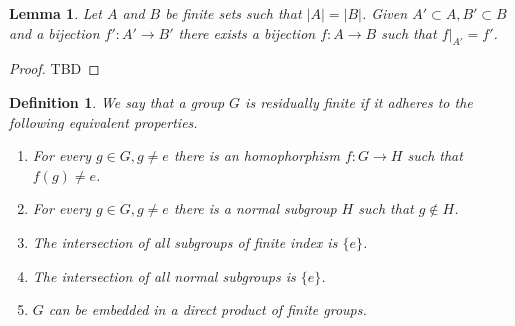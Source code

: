 \documentclass[a4paper]{memoir}
\newtheorem{definition}{Definition}
\newtheorem{lemma}{Lemma}
\begin{document}
    \begin{lemma}\label{lem:finite_bijections} 
        Let $A$ and $B$ be finite sets such that $|A| = |B|$. Given $A' \subset A, B' \subset B$ and a bijection $f': A' \to B'$ there exists a bijection $f:A \to B$ such that $f|_{A'} = f'$. 
    \end{lemma}
    \begin{proof}
        TBD
    \end{proof}

    \begin{definition}\cite{noauthor_residually_2018}
        We say that a group $G$ is residually finite if it adheres to the following equivalent properties.
        \begin{enumerate}
            \item For every $g \in G, g\ne e$ there is an homophorphism $f:G \to H$ such that $f(g) \ne e$.
            \item For every $g \in G, g \ne e$ there is a normal subgroup $H$ such that $g \notin H$.
            \item The intersection of all subgroups of finite index is $\{e\}$.
            \item The intersection of all normal subgroups is $\{e\}$.
            \item $G$ can be embedded in a direct product of finite groups.
        \end{enumerate}
    \end{definition}
\end{document}
